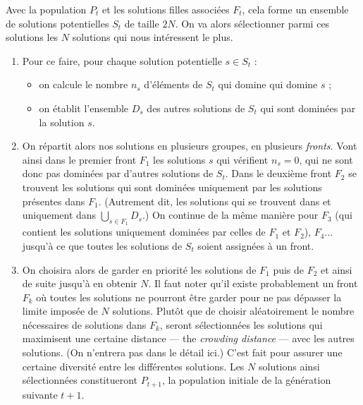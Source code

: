  Avec la population $P_t$ et les solutions filles associées $F_t$, cela forme un ensemble de solutions potentielles $S_t$ de taille $2N$. 
 On va alors sélectionner parmi ces solutions les $N$ solutions qui nous intéressent le plus.
\begin{enumerate}[resume]
 \item Pour ce faire, pour chaque solution potentielle $s\in S_t$ :
 \begin{itemize}
  \item on calcule le nombre $n_s$ d'éléments de $S_t$ qui domine qui domine $s$ ;
  \item on établit l'ensemble $D_s$ des autres solutions de $S_t$ qui sont dominées par la solution $s$.
 \end{itemize}
 \item On répartit alors nos solutions en plusieurs groupes, en plusieurs \emph{fronts}.
 Vont ainsi dans le premier front $F_1$ les solutions $s$ qui vérifient $n_s = 0$, qui ne sont donc pas dominées par d'autres solutions de $S_t$. 
 Dans le deuxième front $F_2$ se trouvent les solutions qui sont dominées uniquement par les solutions présentes dans $F_1$.
 (Autrement dit, les solutions qui se trouvent dans et uniquement dans $\bigcup_{s\in F_1} D_s$.)
 On continue de la même manière pour $F_3$ (qui contient les solutions uniquement dominées par celles de $F_1$ et $F_2$), $F_4$... jusqu'à ce que toutes les solutions de $S_t$ soient assignées à un front.
 \item On choisira alors de garder en priorité les solutions de $F_1$ puis de $F_2$ et ainsi de suite jusqu'à en obtenir $N$. 
 Il faut noter qu'il existe probablement un front $F_k$ où toutes les solutions ne pourront être garder pour ne pas dépasser la limite imposée de $N$ solutions.
 Plutôt que de choisir aléatoirement le nombre nécessaires de solutions dans $F_k$, seront sélectionnées les solutions qui maximisent une certaine distance --- the \emph{crowding distance} --- avec les autres solutions.
 (On n'entrera pas dans le détail ici.)
 C'est fait pour assurer une certaine diversité entre les différentes solutions.
 Les $N$ solutions ainsi sélectionnées constitueront $P_{t+1}$, la population initiale de la génération suivante $t+1$.
\end{enumerate}

